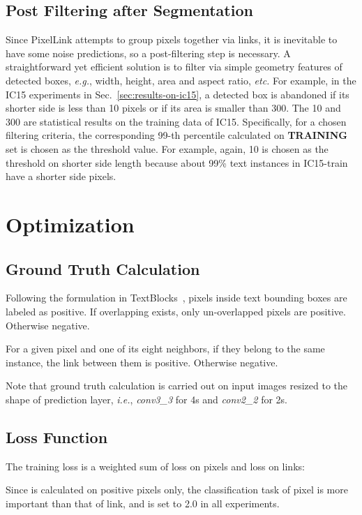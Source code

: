 \documentclass[letterpaper]{article} \usepackage{aaai18}  \usepackage{times}  \usepackage{helvet}  \usepackage{courier}  \usepackage{url}  \usepackage{graphicx}
\begin{document}
	\subsection{Post Filtering after Segmentation}
	Since PixelLink attempts to group pixels together via links, it is inevitable to have some noise predictions, so a post-filtering step is necessary. A straightforward yet efficient solution is to filter via simple geometry features of detected boxes, \emph{e.g.}, width, height, area and aspect ratio, \emph{etc.}  For example, in the IC15 experiments in Sec.~\ref{sec:results-on-ic15}, a detected box is abandoned if its shorter side is less than 10 pixels or if its area is smaller than 300. The 10 and 300 are statistical results on the training data of IC15. Specifically, for a chosen filtering criteria, the corresponding 99-th percentile calculated on \textbf{TRAINING} set is chosen as the threshold value. For example, again, 10 is chosen as the threshold on shorter side length because about 99\% text instances in IC15-train have a shorter side  pixels.
	
	\section{Optimization}
	\subsection{Ground Truth Calculation}
	Following the formulation in TextBlocks~\cite{zhang2016TextBlock}, pixels inside text bounding boxes are labeled as positive. If overlapping exists, only un-overlapped pixels are positive. Otherwise negative.
	
	For a given pixel and one of its eight neighbors, if they belong to the same instance, the link between them is positive. Otherwise negative.
	
	Note that ground truth calculation is carried out on input images resized to the shape of prediction layer, \emph{i.e.}, \emph{conv3\_3} for 4s and \emph{conv2\_2} for 2s.
	
	\subsection{Loss Function}
	The training loss is a weighted sum of loss on pixels and loss on links:
	
	Since  is calculated on positive pixels only, the classification task of pixel is more important than that of link,  and  is set to 2.0 in all experiments.
\end{document}

